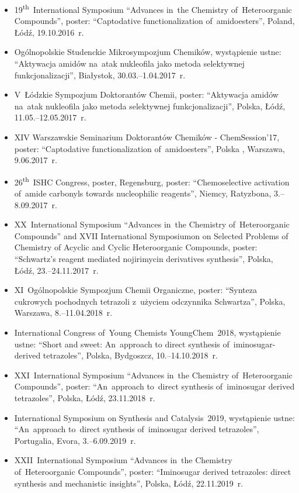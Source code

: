 \begin{fullwidth}
\begin{itemize}
  \item 19\textsuperscript{th}~International Symposium \enquote{Advances in~the Chemistry of~Heteroorganic Compounds}, poster: \enquote{Captodative functionalization of~amidoesters}, Poland, Łódź, 19.10.2016~r.
  \item Ogólnopolskie Studenckie Mikrosympozjum Chemików, wystąpienie ustne: \enquote{Aktywacja amidów na~atak nukleofila jako metoda selektywnej funkcjonalizacji}, Białystok, 30.03.\-–1.04.2017~r.
  \item V~Łódzkie Sympozjum Doktorantów Chemii, poster: \enquote{Aktywacja amidów na~atak nukleofila jako metoda selektywnej funkcjonalizacji}, Polska, Łódź, 11.05.\-–12.05.2017~r.
  \item XIV Warszawskie Seminarium Doktorantów Chemików - ChemSession’17, poster: \enquote{Captodative functionalization of~amidoesters}, Polska , Warszawa, 9.06.2017~r.
  \item 26\textsuperscript{th}~ISHC Congress, poster, Regensburg, poster: \enquote{Chemoselective activation of~amide carbonyls towards nucleophilic reagents}, Niemcy, Ratyzbona, 3.\-–8.09.2017~r.
  \item XX~International Symposium \enquote{Advances in~the Chemistry of~Heteroorganic Compounds} and XVII International Symposiumon on Selected Problems of Chemistry of Acyclic and Cyclic Heteroorganic Compounds, poster: \enquote{Schwartz’s reagent mediated nojirimycin derivatives synthesis}, Polska, Łódź, 23.\-–24.11.2017~r.
  \item XI~Ogólnopolskie Sympozjum Chemii Organiczne, poster: \enquote{Synteza cukrowych pochodnych tetrazoli z~użyciem odczynnika Schwartza}, Polska, Warszawa, 8.\-–11.04.2018~r.
  \item International Congress of~Young Chemists YoungChem~2018, wystąpienie ustne: \enquote{Short and sweet: An~approach to direct synthesis of~iminosugar-derived tetrazoles}, Polska, Bydgoszcz, 10.\-–14.10.2018~r.
  \item XXI~International Symposium \enquote{Advances in~the Chemistry of~Heteroorganic Compounds}, poster: \enquote{An~approach to~direct synthesis of~iminosugar derived tetrazoles}, Polska, Łódź, 23.11.2018~r.
  \item International Symposium on Synthesis and Catalysis~2019, wystąpienie ustne: \enquote{An~approach to~direct synthesis of~iminosugar derived tetrazoles}, Portugalia, Evora, 3.\-–6.09.2019~r.
  \item XXII~International Symposium \enquote{Advances in~the Chemistry of~Heteroorganic Compounds}, poster: \enquote{Iminosugar derived tetrazoles: direct synthesis and mechanistic insights}, Polska, Łódź, 22.11.2019~r.
\end{itemize}
\end{fullwidth}

